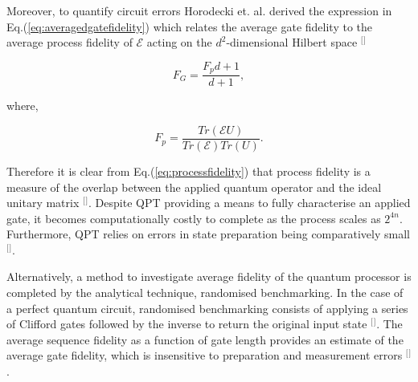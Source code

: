 Moreover, to quantify circuit errors Horodecki et. al. derived the expression in Eq.(\ref{eq:averagedgatefidelity}) which relates the average gate fidelity to the average process fidelity of $\mathcal{E}$ acting on the $d^{2}$-dimensional Hilbert space $^{[}$\citep{Horodecki1998GeneralQuasi-distillation}$^{]}$

\begin{equation}
\label{eq:averagedgatefidelity}
F_{G}=\frac{F_{p}d+1}{d+1},
\end{equation}

where,

\begin{equation}
\label{eq:processfidelity}
F_{p}=\frac{Tr(\mathcal{E} U)}{Tr(\mathcal{E})Tr(U)}.
\end{equation}

Therefore it is clear from Eq.(\ref{eq:processfidelity}) that process fidelity is a measure of the overlap between the applied quantum operator and the ideal unitary matrix $^{[}$\citep{Micuda2014Process-fidelityStudy}$^{]}$. Despite QPT providing a means to fully characterise an applied gate, it becomes computationally costly to complete as the process scales as $2^{4n}$. Furthermore, QPT relies on errors in state preparation being comparatively small $^{[}$\citep{Ringbauer2017ExploringPhotons}$^{]}$. 

Alternatively, a method to investigate average fidelity of the quantum processor is completed by the analytical technique, randomised benchmarking. In the case of a perfect quantum circuit, randomised benchmarking consists of applying a series of Clifford gates followed by the inverse to return the original input state $^{[}$\citep{Proctor2017WhatMeasures}$^{]}$. The average sequence fidelity as a function of gate length provides an estimate of the average gate fidelity, which is insensitive to preparation and measurement errors $^{[}$\citep{Magesan2011ScalableProcesses}$^{]}$. 



